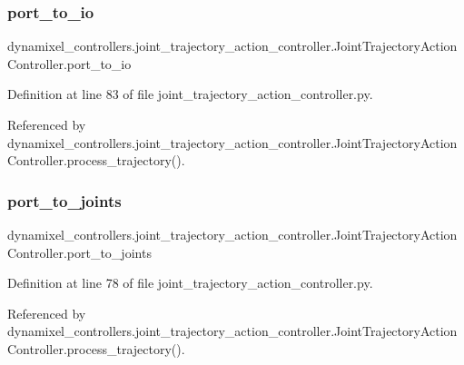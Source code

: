 \subsubsection{\texorpdfstring{port\+\_\+to\+\_\+io}{port\_to\_io}}
{\footnotesize\ttfamily dynamixel\+\_\+controllers.\+joint\+\_\+trajectory\+\_\+action\+\_\+controller.\+Joint\+Trajectory\+Action\+Controller.\+port\+\_\+to\+\_\+io}



Definition at line 83 of file joint\+\_\+trajectory\+\_\+action\+\_\+controller.\+py.



Referenced by dynamixel\+\_\+controllers.\+joint\+\_\+trajectory\+\_\+action\+\_\+controller.\+Joint\+Trajectory\+Action\+Controller.\+process\+\_\+trajectory().

\mbox{\label{classdynamixel__controllers_1_1joint__trajectory__action__controller_1_1_joint_trajectory_action_controller_a21d1737e89a2838cfc6f87a8dfce9570}} 
\subsubsection{\texorpdfstring{port\+\_\+to\+\_\+joints}{port\_to\_joints}}
{\footnotesize\ttfamily dynamixel\+\_\+controllers.\+joint\+\_\+trajectory\+\_\+action\+\_\+controller.\+Joint\+Trajectory\+Action\+Controller.\+port\+\_\+to\+\_\+joints}



Definition at line 78 of file joint\+\_\+trajectory\+\_\+action\+\_\+controller.\+py.



Referenced by dynamixel\+\_\+controllers.\+joint\+\_\+trajectory\+\_\+action\+\_\+controller.\+Joint\+Trajectory\+Action\+Controller.\+process\+\_\+trajectory().

